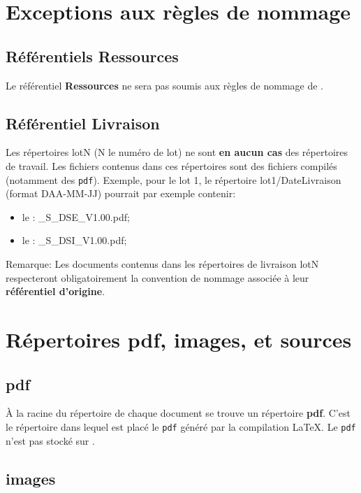 \section{Exceptions aux règles de nommage}\label{Regle specifique}

\subsection{Référentiels Ressources}

Le référentiel \textbf{Ressources} ne sera pas soumis aux règles de nommage de \nomEquipe.

\subsection{Référentiel Livraison}

Les répertoires lotN (N le numéro de lot) ne sont \textbf{en aucun cas} des répertoires de travail.
Les fichiers contenus dans ces répertoires sont des fichiers compilés (notamment des \verb+pdf+).
Exemple, pour le lot 1, le répertoire lot1/DateLivraison (format DAA-MM-JJ) pourrait par exemple contenir:
	\begin{itemize}
		\item le \DSE{}: \nomEquipe\_S\_DSE\_V1.00.pdf;
		\item le \DSI{}: \nomEquipe\_S\_DSI\_V1.00.pdf;
	\end{itemize}
Remarque: Les documents contenus dans les répertoires de livraison  lotN respecteront
obligatoirement la convention de nommage associée à leur \textbf{référentiel d'origine}.

\section{Répertoires pdf, images, et sources}

\subsection{pdf}

\`{A} la racine du répertoire de chaque document se trouve un répertoire \textbf{pdf}. C'est
le répertoire dans lequel est placé le \verb+pdf+ généré par la compilation \LaTeX{}. Le \verb+pdf+ n'est pas stocké sur \git{}.

\subsection{images}

